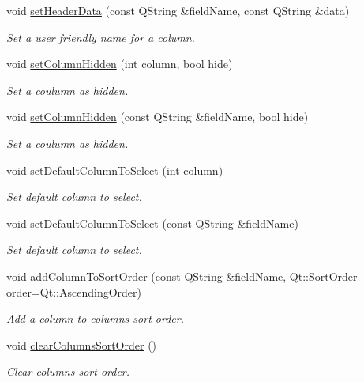 \begin{DoxyCompactItemize}
void \hyperlink{classmdt_sql_table_widget_a591461ee19f22008a5c310609461081e}{set\-Header\-Data} (const Q\-String \&field\-Name, const Q\-String \&data)
\begin{DoxyCompactList}\small\item\em Set a user friendly name for a column. \end{DoxyCompactList}\item 
void \hyperlink{classmdt_sql_table_widget_a466ff75bee2a0efd99c62994f65a5d18}{set\-Column\-Hidden} (int column, bool hide)
\begin{DoxyCompactList}\small\item\em Set a coulumn as hidden. \end{DoxyCompactList}\item 
void \hyperlink{classmdt_sql_table_widget_ae1eefd42d91ea36fa4244d7f265d7222}{set\-Column\-Hidden} (const Q\-String \&field\-Name, bool hide)
\begin{DoxyCompactList}\small\item\em Set a coulumn as hidden. \end{DoxyCompactList}\item 
void \hyperlink{classmdt_sql_table_widget_a6c54d9c26f7bb6241607785586bcc52e}{set\-Default\-Column\-To\-Select} (int column)
\begin{DoxyCompactList}\small\item\em Set default column to select. \end{DoxyCompactList}\item 
void \hyperlink{classmdt_sql_table_widget_a17d60fda061030fdfe15be5445eadc76}{set\-Default\-Column\-To\-Select} (const Q\-String \&field\-Name)
\begin{DoxyCompactList}\small\item\em Set default column to select. \end{DoxyCompactList}\item 
void \hyperlink{classmdt_sql_table_widget_af15137a744ce87cb4b5009e2df9fca35}{add\-Column\-To\-Sort\-Order} (const Q\-String \&field\-Name, Qt\-::\-Sort\-Order order=Qt\-::\-Ascending\-Order)
\begin{DoxyCompactList}\small\item\em Add a column to columns sort order. \end{DoxyCompactList}\item 
void \hyperlink{classmdt_sql_table_widget_a54e2e47d9dffe0845e1748fb36c2ea7f}{clear\-Columns\-Sort\-Order} ()
\begin{DoxyCompactList}\small\item\em Clear columns sort order. \end{DoxyCompactList}\item 

\end{DoxyCompactItemize}
